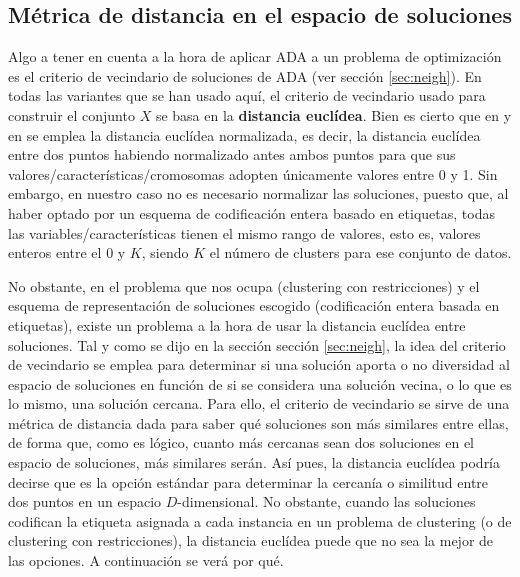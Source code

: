 \subsection{Métrica de distancia en el espacio de soluciones}

Algo a tener en cuenta a la hora de aplicar ADA a un problema de optimización es el criterio de vecindario de soluciones de ADA (ver sección \ref{sec:neigh}). En todas las variantes que se han usado aquí, el criterio de vecindario usado para construir el conjunto $X$ se basa en la \textbf{distancia euclídea}. Bien es cierto que en \cite{tanabe2019framework} y en \cite{tanabe2018decomposition} se emplea la distancia euclídea normalizada, es decir, la distancia euclídea entre dos puntos habiendo normalizado antes ambos puntos para que sus valores/características/cromosomas adopten únicamente valores entre 0 y 1. Sin embargo, en nuestro caso no es necesario normalizar las soluciones, puesto que, al haber optado por un esquema de codificación entera basado en etiquetas, todas las variables/características tienen el mismo rango de valores, esto es, valores enteros entre el $0$ y $K$, siendo $K$ el número de clusters para ese conjunto de datos.

No obstante, en el problema que nos ocupa (clustering con restricciones) y el esquema de representación de soluciones escogido (codificación entera basada en etiquetas), existe un problema a la hora de usar la distancia euclídea entre soluciones. Tal y como se dijo en la sección sección \ref{sec:neigh}, la idea del criterio de vecindario se emplea para determinar si una solución aporta o no diversidad al espacio de soluciones en función de si se considera una solución vecina, o lo que es lo mismo, una solución cercana. Para ello, el criterio de vecindario se sirve de una métrica de distancia dada para saber qué soluciones son más similares entre ellas, de forma que, como es lógico, cuanto más cercanas sean dos soluciones en el espacio de soluciones, más similares serán. Así pues, la distancia euclídea podría decirse que es la opción estándar para determinar la cercanía o similitud entre dos puntos en un espacio $D$-dimensional. No obstante, cuando las soluciones codifican la etiqueta asignada a cada instancia en un problema de clustering (o de clustering con restricciones), la distancia euclídea puede que no sea la mejor de las opciones. A continuación se verá por qué.

